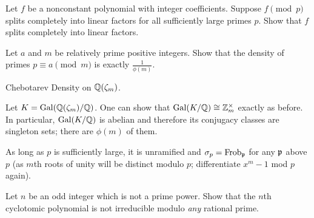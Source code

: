 \begin{problem}
	Let $f$ be a nonconstant polynomial with integer coefficients.
	Suppose $f \pmod p$ splits completely into linear factors
	for all sufficiently large primes $p$.
	Show that $f$ splits completely into linear factors.
\end{problem}

\begin{dproblem}
	Let $a$ and $m$ be relatively prime positive integers.
	Show that the density of primes $p \equiv a \pmod m$ is exactly $\frac{1}{\phi(m)}$.
	\begin{hint}
		Chebotarev Density on $\mathbb Q(\zeta_m)$.
	\end{hint}
	\begin{sol}
		Let $K = \operatorname{Gal}(\mathbb Q(\zeta_m)/\mathbb Q)$.
		One can show that $\operatorname{Gal}(K/\mathbb Q) \cong \mathbb Z_{m}^\times$ exactly as before.
		In particular, $\operatorname{Gal}(K/\mathbb Q)$ is abelian and therefore its conjugacy classes
		are singleton sets; there are $\phi(m)$ of them.

		As long as $p$ is sufficiently large, it is unramified
		and $\sigma_p = \mathrm{Frob}_\mathfrak p$ for any $\mathfrak p$ above $p$
		(as $m$th roots of unity will be distinct modulo $p$;
		differentiate $x^m-1$ mod $p$ again).
	\end{sol}
\end{dproblem}

\begin{problem}
	Let $n$ be an odd integer which is not a prime power.
	Show that the $n$th cyclotomic polynomial is not
	irreducible modulo \emph{any} rational prime.
\end{problem}

